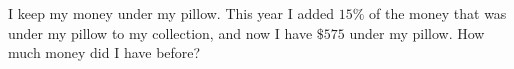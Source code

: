 I keep my money under my pillow. This year I added $15\%$ of the money that was under my pillow to my collection, and now I have $\$575$ under my pillow. How much money did I have before?

